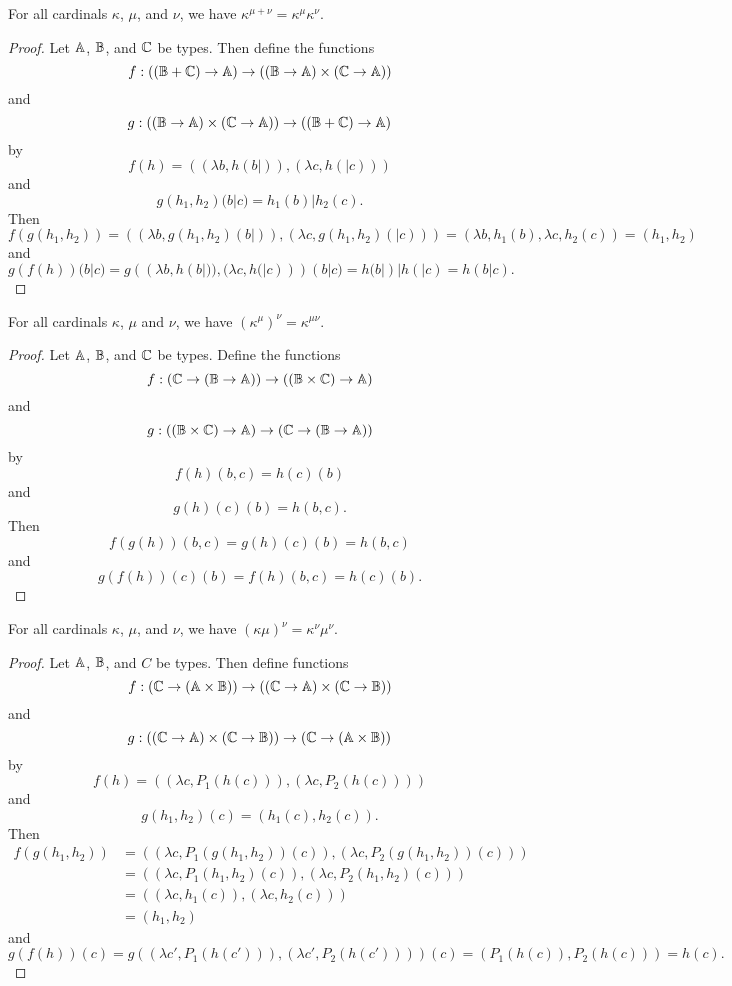\documentclass[../../math.tex]{subfiles}
\begin{document}
\begin{theorem}
    For all cardinals $\kappa$, $\mu$, and $\nu$, we have $\kappa ^ {\mu + \nu}
    = \kappa ^ \mu \kappa ^ \nu$.
\end{theorem}
\begin{proof}
    Let $\mathbb{A}$, $\mathbb{B}$, and $\mathbb{C}$ be types.  Then define the functions
    \[
        f : ((\mathbb{B} + \mathbb{C}) \to \mathbb{A}) \to ((\mathbb{B} \to \mathbb{A}) \times (\mathbb{C} \to \mathbb{A}))
    \]
    and
    \[
        g : ((\mathbb{B} \to \mathbb{A}) \times (\mathbb{C} \to \mathbb{A})) \to ((\mathbb{B} + \mathbb{C}) \to \mathbb{A})
    \]
    by
    \[
        f(h) = ((\lambda b, h(b|)), (\lambda c, h(|c)))
    \]
    and
    \[
        g(h_1, h_2)(b|c) = h_1(b)|h_2(c).
    \]
    Then
    \[
        f(g(h_1, h_2))
        = ((\lambda b, g(h_1, h_2)(b|)), (\lambda c, g(h_1, h_2)(|c)))
        = (\lambda b, h_1(b), \lambda c, h_2(c))
        = (h_1, h_2)
    \]
    and
    \[
        g(f(h))(b|c)
        = g((\lambda b, h(b|)), (\lambda c, h(|c)))(b|c)
        = h(b|)|h(|c)
        = h(b|c).
    \]
\end{proof}

\begin{theorem}
    For all cardinals $\kappa$, $\mu$ and $\nu$, we have $(\kappa ^ \mu) ^ \nu =
    \kappa ^ {\mu \nu}$.
\end{theorem}
\begin{proof}
    Let $\mathbb{A}$, $\mathbb{B}$, and $\mathbb{C}$ be types.  Define the functions
    \[
        f : (\mathbb{C} \to (\mathbb{B} \to \mathbb{A})) \to ((\mathbb{B} \times \mathbb{C}) \to \mathbb{A})
    \]
    and
    \[
        g : ((\mathbb{B} \times \mathbb{C}) \to \mathbb{A}) \to (\mathbb{C} \to (\mathbb{B} \to \mathbb{A}))
    \]
    by
    \[
        f(h)(b, c) = h(c)(b)
    \]
    and
    \[
        g(h)(c)(b) = h(b, c).
    \]
    Then
    \[
        f(g(h))(b, c) = g(h)(c)(b) = h(b, c)
    \]
    and
    \[
        g(f(h))(c)(b) = f(h)(b, c) = h(c)(b).
    \]
\end{proof}

\begin{theorem}
    For all cardinals $\kappa$, $\mu$, and $\nu$, we have $(\kappa \mu)^\nu =
    \kappa ^ \nu \mu ^ \nu$.
\end{theorem}
\begin{proof}
    Let $\mathbb{A}$, $\mathbb{B}$, and $C$ be types.  Then define functions
    \[
        f : (\mathbb{C} \to (\mathbb{A} \times \mathbb{B})) \to ((\mathbb{C} \to \mathbb{A}) \times (\mathbb{C} \to \mathbb{B}))
    \]
    and
    \[
        g : ((\mathbb{C} \to \mathbb{A}) \times (\mathbb{C} \to \mathbb{B})) \to (\mathbb{C} \to (\mathbb{A} \times \mathbb{B}))
    \]
    by
    \[
        f(h) = ((\lambda c, P_1(h(c))), (\lambda c, P_2(h(c))))
    \]
    and
    \[
        g(h_1, h_2)(c) = (h_1(c), h_2(c)).
    \]
    Then
    \begin{align*}
        f(g(h_1, h_2))
        &= ((\lambda c, P_1(g(h_1, h_2))(c)), (\lambda c, P_2(g(h_1, h_2))(c)))
            \\
        &= ((\lambda c, P_1(h_1, h_2)(c)), (\lambda c, P_2(h_1, h_2)(c))) \\
        &= ((\lambda c, h_1(c)), (\lambda c, h_2(c))) \\
        &= (h_1, h_2)
    \end{align*}
    and
    \[
        g(f(h))(c)
        = g((\lambda c', P_1(h(c'))), (\lambda c', P_2(h(c'))))(c)
        = (P_1(h(c)), P_2(h(c)))
        = h(c).
    \]
\end{proof}
\end{document}
